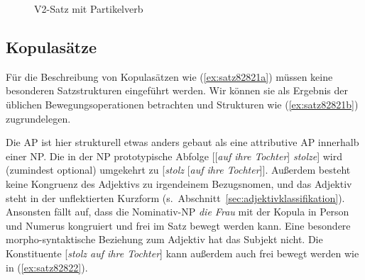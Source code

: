 \begin{figure}
  \centering
  \vspace{0.3cm}
  \caption{V2-Satz mit Partikelverb}
  \label{fig:v2mitpartikel}
\end{figure}

\subsection{Kopulasätze}

\label{sec:kopulakonstruktionen}


Für die Beschreibung von Kopulasätzen wie (\ref{ex:satz82821a}) müssen keine besonderen Satzstrukturen eingeführt werden.
Wir können sie als Ergebnis der üblichen Bewegungsoperationen betrachten und Strukturen wie (\ref{ex:satz82821b}) zugrundelegen.

\begin{exe}
  \ex\label{ex:satz82821} 
  \begin{xlist}
  \end{xlist}
\end{exe}

Die AP ist hier strukturell etwas anders gebaut als eine attributive AP innerhalb einer NP.
Die in der NP prototypische Abfolge [[\textit{auf ihre Tochter}] \textit{stolze}] wird (zumindest optional) umgekehrt zu [\textit{stolz} [\textit{auf ihre Tochter}]].
Außerdem besteht keine Kongruenz des Adjektivs zu irgendeinem Bezugsnomen, und das Adjektiv steht in der unflektierten Kurzform (s.\ Abschnitt~\ref{sec:adjektivklassifikation}).
Ansonsten fällt auf, dass die Nominativ-NP \textit{die Frau} mit der Kopula in Person und Numerus kongruiert und frei im Satz bewegt werden kann.
Eine besondere morpho-syntaktische Beziehung zum Adjektiv hat das Subjekt nicht.
Die Konstituente [\textit{stolz auf ihre Tochter}] kann außerdem auch frei bewegt werden wie in (\ref{ex:satz82822}).

